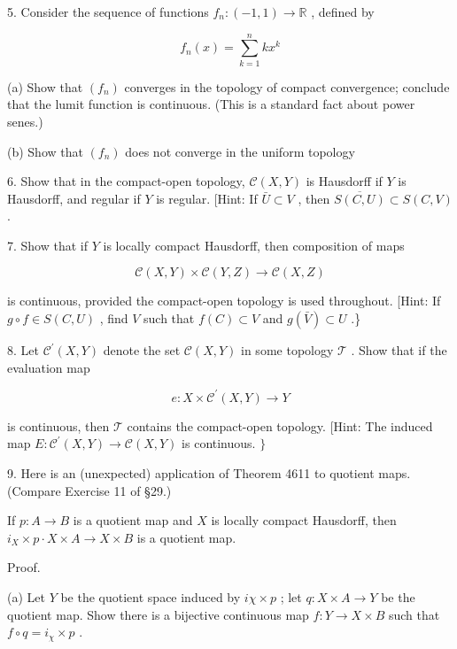 5. Consider the sequence of functions \({f}_{n} : \left( {-1,1}\right)  \rightarrow  \mathbb{R}\) , defined by

\[
{f}_{n}\left( x\right)  = \mathop{\sum }\limits_{{k = 1}}^{n}k{x}^{k}
\]

(a) Show that \(\left( {f}_{n}\right)\) converges in the topology of compact convergence; conclude that the lumit function is continuous. (This is a standard fact about power senes.)

(b) Show that \(\left( {f}_{n}\right)\) does not converge in the uniform topology

6. Show that in the compact-open topology, \(\mathcal{C}\left( {X,Y}\right)\) is Hausdorff if \(Y\) is Hausdorff, and regular if \(Y\) is regular. [Hint: If \(\bar{U} \subset  V\) , then \(\overline{S\left( {C,U}\right) } \subset  S\left( {C,V}\right)\) .

7. Show that if \(Y\) is locally compact Hausdorff, then composition of maps

\[
\mathcal{C}\left( {X,Y}\right)  \times  \mathcal{C}\left( {Y,Z}\right)  \rightarrow  \mathcal{C}\left( {X,Z}\right)
\]

is continuous, provided the compact-open topology is used throughout. [Hint: If \(g \circ  f \in  S\left( {C,U}\right)\) , find \(V\) such that \(f\left( C\right)  \subset  V\) and \(g\left( \bar{V}\right)  \subset  U\) .\}

8. Let \({\mathcal{C}}^{\prime }\left( {X,Y}\right)\) denote the set \(\mathcal{C}\left( {X,Y}\right)\) in some topology \(\mathcal{T}\) . Show that if the evaluation map

\[
e : X \times  {\mathcal{C}}^{\prime }\left( {X,Y}\right)  \rightarrow  Y
\]

is continuous, then \(\mathcal{T}\) contains the compact-open topology. [Hint: The induced map \(E : {\mathcal{C}}^{\prime }\left( {X,Y}\right)  \rightarrow  \mathcal{C}\left( {X,Y}\right)\) is continuous. \(\}\)

9. Here is an (unexpected) application of Theorem 4611 to quotient maps. (Compare Exercise 11 of §29.)

\begin{theorem} If \(p : A \rightarrow  B\) is a quotient map and \(X\) is locally compact Hausdorff, then \({i}_{X} \times  p \cdot  X \times  A \rightarrow  X \times  B\) is a quotient map.
\end{theorem}

Proof.

(a) Let \(Y\) be the quotient space induced by \({i\chi } \times  p\) ; let \(q : X \times  A \rightarrow  Y\) be the quotient map. Show there is a bijective continuous map \(f : Y \rightarrow  X \times  B\) such that \(f \circ  q = {i}_{\chi } \times  p\) .

